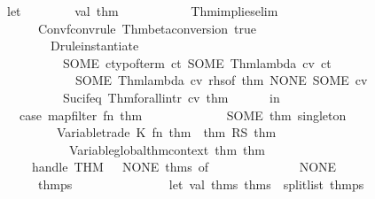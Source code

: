 \begin{isabellebody}
\ \ \ \ \ \ let\isanewline
\ \ \ \ \ \ \ \ val\ thm{\isacharprime}\ {\isacharequal}\isanewline
\ \ \ \ \ \ \ \ \ \ Thm{\isachardot}implies{\isacharunderscore}elim\isanewline
\ \ \ \ \ \ \ \ \ \ \ {\isacharparenleft}Conv{\isachardot}fconv{\isacharunderscore}rule\ {\isacharparenleft}Thm{\isachardot}beta{\isacharunderscore}conversion\ true{\isacharparenright}\isanewline
\ \ \ \ \ \ \ \ \ \ \ \ \ {\isacharparenleft}Drule{\isachardot}instantiate{\isacharprime}\isanewline
\ \ \ \ \ \ \ \ \ \ \ \ \ \ \ {\isacharbrackleft}SOME\ {\isacharparenleft}ctyp{\isacharunderscore}of{\isacharunderscore}term\ ct{\isacharparenright}{\isacharbrackright}\ {\isacharbrackleft}SOME\ {\isacharparenleft}Thm{\isachardot}lambda\ cv\ ct{\isacharparenright}{\isacharcomma}\isanewline
\ \ \ \ \ \ \ \ \ \ \ \ \ \ \ \ \ SOME\ {\isacharparenleft}Thm{\isachardot}lambda\ cv{\isacharprime}\ {\isacharparenleft}rhs{\isacharunderscore}of\ thm{\isacharparenright}{\isacharparenright}{\isacharcomma}\ NONE{\isacharcomma}\ SOME\ cv{\isacharprime}{\isacharbrackright}\isanewline
\ \ \ \ \ \ \ \ \ \ \ \ \ \ \ Suc{\isacharunderscore}if{\isacharunderscore}eq{\isacharparenright}{\isacharparenright}\ {\isacharparenleft}Thm{\isachardot}forall{\isacharunderscore}intr\ cv{\isacharprime}\ thm{\isacharparenright}\isanewline
\ \ \ \ \ \ in\isanewline
\ \ \ \ \ \ \ \ case\ map{\isacharunderscore}filter\ {\isacharparenleft}fn\ thm{\isacharprime}{\isacharprime}\ {\isacharequal}{\isachargreater}\isanewline
\ \ \ \ \ \ \ \ \ \ \ \ SOME\ {\isacharparenleft}thm{\isacharprime}{\isacharprime}{\isacharcomma}\ singleton\isanewline
\ \ \ \ \ \ \ \ \ \ \ \ \ \ {\isacharparenleft}Variable{\isachardot}trade\ {\isacharparenleft}K\ {\isacharparenleft}fn\ {\isacharbrackleft}thm{\isacharprime}{\isacharprime}{\isacharprime}{\isacharbrackright}\ {\isacharequal}{\isachargreater}\ {\isacharbrackleft}thm{\isacharprime}{\isacharprime}{\isacharprime}\ RS\ thm{\isacharprime}{\isacharbrackright}{\isacharparenright}{\isacharparenright}\isanewline
\ \ \ \ \ \ \ \ \ \ \ \ \ \ \ \ {\isacharparenleft}Variable{\isachardot}global{\isacharunderscore}thm{\isacharunderscore}context\ thm{\isacharprime}{\isacharprime}{\isacharparenright}{\isacharparenright}\ thm{\isacharprime}{\isacharprime}{\isacharparenright}\isanewline
\ \ \ \ \ \ \ \ \ \ handle\ THM\ {\isacharunderscore}\ {\isacharequal}{\isachargreater}\ NONE{\isacharparenright}\ thms\ of\isanewline
\ \ \ \ \ \ \ \ \ \ \ \ {\isacharbrackleft}{\isacharbrackright}\ {\isacharequal}{\isachargreater}\ NONE\isanewline
\ \ \ \ \ \ \ \ \ \ {\isacharbar}\ thmps\ {\isacharequal}{\isachargreater}\isanewline
\ \ \ \ \ \ \ \ \ \ \ \ \ \ let\ val\ {\isacharparenleft}thms{}{\isacharcomma}\ thms{}{\isacharparenright}\ {\isacharequal}\ split{\isacharunderscore}list\ thmps\isanewline

\end{isabellebody}

